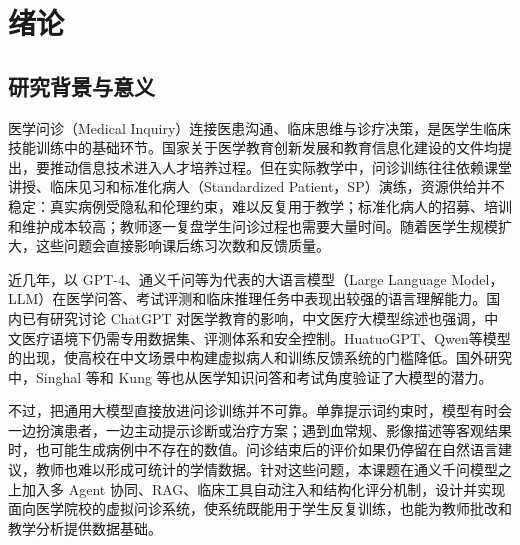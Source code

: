 \chapter{绪论}

\section{研究背景与意义}

医学问诊（Medical Inquiry）连接医患沟通、临床思维与诊疗决策，是医学生临床技能训练中的基础环节。国家关于医学教育创新发展和教育信息化建设的文件均提出，要推动信息技术进入人才培养过程\cite{gov2020mededu,moe2018eduinfo}。但在实际教学中，问诊训练往往依赖课堂讲授、临床见习和标准化病人（Standardized Patient，SP）演练\cite{zhao2012sp}，资源供给并不稳定：真实病例受隐私和伦理约束，难以反复用于教学；标准化病人的招募、培训和维护成本较高；教师逐一复盘学生问诊过程也需要大量时间。随着医学生规模扩大，这些问题会直接影响课后练习次数和反馈质量。

近几年，以 GPT-4、通义千问等为代表的大语言模型（Large Language Model，LLM）在医学问答、考试评测和临床推理任务中表现出较强的语言理解能力。国内已有研究讨论 ChatGPT 对医学教育的影响\cite{qu2023chatgpt}，中文医疗大模型综述也强调，中文医疗语境下仍需专用数据集、评测体系和安全控制\cite{ji2024chinesemedllm}。HuatuoGPT\cite{zhang2023huatuogpt}、Qwen\cite{bai2023qwen}等模型的出现，使高校在中文场景中构建虚拟病人和训练反馈系统的门槛降低。国外研究中，Singhal 等\cite{singhal2023clinicalknowledge}和 Kung 等\cite{kung2023chatgpt}也从医学知识问答和考试角度验证了大模型的潜力。

不过，把通用大模型直接放进问诊训练并不可靠。单靠提示词约束时，模型有时会一边扮演患者，一边主动提示诊断或治疗方案；遇到血常规、影像描述等客观结果时，也可能生成病例中不存在的数值。问诊结束后的评价如果仍停留在自然语言建议，教师也难以形成可统计的学情数据。针对这些问题，本课题在通义千问模型之上加入多 Agent 协同、RAG、临床工具自动注入和结构化评分机制，设计并实现面向医学院校的虚拟问诊系统，使系统既能用于学生反复训练，也能为教师批改和教学分析提供数据基础。


